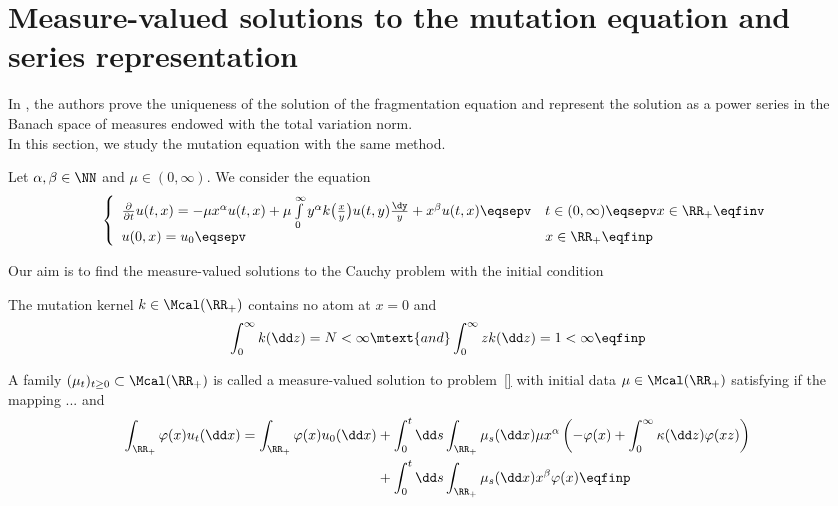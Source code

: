 
\section{Measure-valued solutions to the mutation equation and series representation}
\label{s:measure_series_repr}

In \cite{doumic2021inverse}, the authors prove the uniqueness of the solution of the fragmentation equation and represent the solution as a power series in the Banach space of measures endowed with the total variation norm. \\

In this section, we study the mutation equation with the same method. 

Let $\alpha, \beta \in \NN$ and $\mu \in (0, \infty)$.  
We consider the equation 
\begin{equation}\left\{
    \begin{array}{ll}
	\frac{\partial}{\partial t}u(t,x) = - \mu x^\alpha u(t,x) + \mu \int\limits_{0}^{\infty} y^\alpha k\big( \frac{x}{y}\big)u(t,y) \frac{\dy}{y} + x^\beta u(t,x) \eqsepv
	& t \in (0, \infty) \eqsepv x \in \RR_+ \eqfinv
	\\ u(0, x) = u_0 \eqsepv
	&  x \in \RR_+
	\eqfinp
    \end{array}
	\right.
    \label{eq:DET00.2.4}
\end{equation}

Our aim is to find the measure-valued solutions to the Cauchy problem with the initial condition

\begin{hypothesis}
The mutation kernel $k \in \Mcal(\RR_+)$ contains no atom at $x = 0$ and 
$$ \int_0^\infty k(\dd z) = N < \infty \mtext{and} \int_0^\infty z k(\dd z) = 1 < \infty \eqfinp$$ 
\end{hypothesis}

\begin{definition}\label{def:DETinv2.1}
    A family $(\mu_t)_{t \geq 0} \subset \Mcal(\RR_+)$ is called a measure-valued solution to problem~\eqref{} with initial data $\mu \in \Mcal(\RR_+)$ satisfying  if the mapping ... 
    and 
    \begin{align*}
        \int_{\RR_+} \varphi(x) u_t(\dd x)
        = 
        \int_{\RR_+} \varphi(x) u_0(\dd x) 
        &+ \int_0^t\dd s \int_{\RR_+} \mu_s(\dd x)\mu x^\alpha \left( - \varphi(x) + \int_0^\infty \kappa(\dd z)\varphi(xz)\right) \\
        &+ \int_0^t\dd s \int_{\RR_+} \mu_s(\dd x) x^\beta \varphi(x)
        \eqfinp
    \end{align*}
\end{definition}

